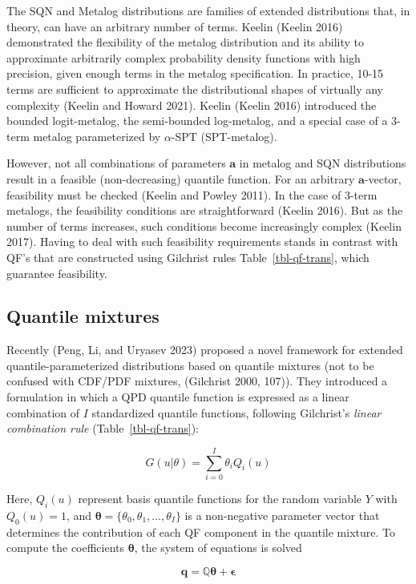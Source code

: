 \documentclass[
]{interact}
\begin{document}
The SQN and Metalog distributions are families of extended distributions
that, in theory, can have an arbitrary number of terms. Keelin (Keelin
2016) demonstrated the flexibility of the metalog distribution and its
ability to approximate arbitrarily complex probability density functions
with high precision, given enough terms in the metalog specification. In
practice, 10-15 terms are sufficient to approximate the distributional
shapes of virtually any complexity (Keelin and Howard 2021). Keelin
(Keelin 2016) introduced the bounded logit-metalog, the semi-bounded
log-metalog, and a special case of a 3-term metalog parameterized by
\(\alpha\)-SPT (SPT-metalog).

However, not all combinations of parameters \(\mathbf{a}\) in metalog
and SQN distributions result in a feasible (non-decreasing) quantile
function. For an arbitrary \(\mathbf{a}\)-vector, feasibility must be
checked (Keelin and Powley 2011). In the case of 3-term metalogs, the
feasibility conditions are straightforward (Keelin 2016). But as the
number of terms increases, such conditions become increasingly complex
(Keelin 2017). Having to deal with such feasibility requirements stands
in contrast with QF's that are constructed using Gilchrist rules
Table~\ref{tbl-qf-trans}, which guarantee feasibility.

\subsection{Quantile mixtures}\label{quantile-mixtures}

Recently (Peng, Li, and Uryasev 2023) proposed a novel framework for
extended quantile-parameterized distributions based on quantile mixtures
(not to be confused with CDF/PDF mixtures, (Gilchrist 2000, 107)). They
introduced a formulation in which a QPD quantile function is expressed
as a linear combination of \(I\) standardized quantile functions,
following Gilchrist's \emph{linear combination rule}
(Table~\ref{tbl-qf-trans}):

\[
G(u\vert\theta)=\sum_{i=0}^I\theta_iQ_i(u)
\]

Here, \(Q_i(u)\) represent basis quantile functions for the random
variable \(Y\) with \(Q_0(u)=1\), and
\(\pmb\theta=\{\theta_0,\theta_1,\dots,\theta_I\}\) is a non-negative
parameter vector that determines the contribution of each QF component
in the quantile mixture. To compute the coefficients \(\pmb\theta\), the
system of equations is solved

\[
\mathbf q=\mathbb Q \pmb\theta+\pmb\epsilon
\]
\end{document}
